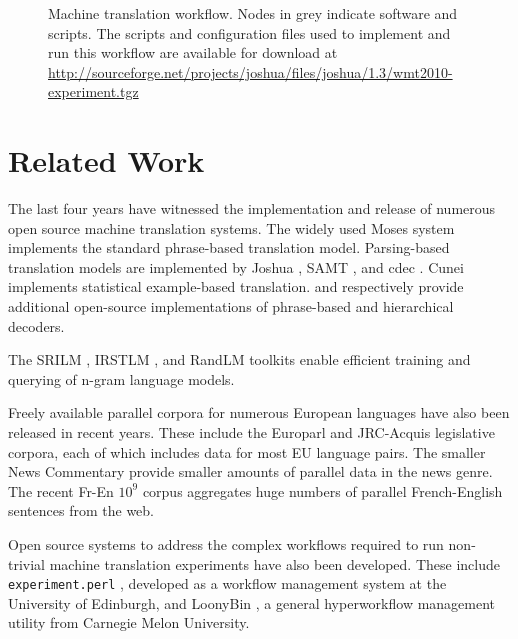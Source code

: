 \documentclass[11pt]{article}
\begin{document}
\begin{figure*}[htbp]

\caption{Machine translation workflow. Nodes in grey indicate software and scripts. The scripts and configuration files used to implement and run this workflow are available for download at \url{http://sourceforge.net/projects/joshua/files/joshua/1.3/wmt2010-experiment.tgz}}
\label{dependencyGraph}
\end{figure*}


\section{Related Work}
\label{Related Work}

The last four years have witnessed the implementation and release of numerous open source machine translation systems. The widely used Moses system \cite{moses} implements the standard phrase-based translation model. Parsing-based translation models are implemented by Joshua \cite{Joshua-WMT}, SAMT \cite{samt2006}, and cdec \cite{cdec}. Cunei \cite{Phillips2009} implements statistical example-based translation.  and  respectively provide additional open-source implementations of phrase-based and hierarchical decoders.

The SRILM \cite{Stolcke2002}, IRSTLM \cite{IRSTLM}, and RandLM \cite{Talbot2007a} toolkits enable efficient training and querying of n-gram language models. 

Freely available parallel corpora for numerous European languages have also been released in recent years. These include the Europarl \cite{Koehn-europarl} and JRC-Acquis \cite{Steinberger-2006} legislative corpora, each of which includes data for most EU language pairs. The smaller News Commentary \cite{Callison-Burch2007a,Callison-Burch2008a} provide smaller amounts of parallel data in the news genre. The recent Fr-En $10^9$ \cite{WMT09-Findings} corpus aggregates huge numbers of parallel French-English sentences from the web.

Open source systems to address the complex workflows required to run non-trivial machine translation experiments have also been developed. These include {\tt experiment.perl} \cite{experiment.perl}, developed as a workflow management system at the University of Edinburgh, and LoonyBin \cite{LoonyBin}, a general hyperworkflow management utility from Carnegie Melon University.
\end{document}
